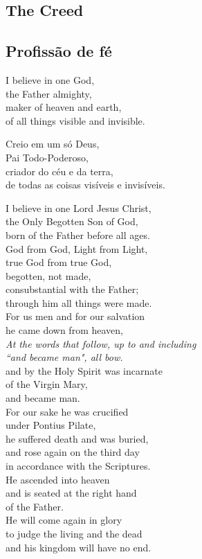 \documentclass[10pt,a5]{article}
\newcommand \subsect[2] {\subsection*{#1} \switchcolumn \subsection*{#2} \switchcolumn*}
\begin{document}
\begin{paracol}{2}

 \subsect{The Creed}{Profiss\~ao de f\'e}
I believe in one God,\\
the Father almighty,\\
maker of heaven and earth,\\
of all things visible and invisible.\\

\switchcolumn

Creio em um só Deus,\\
Pai Todo-Poderoso,\\
criador do céu e da terra,  \\
de todas as coisas visíveis e invisíveis.  \\

\switchcolumn

I believe in one Lord Jesus Christ,\\
the Only Begotten Son of God,\\
born of the Father before all ages.\\
God from God, Light from Light,\\
true God from true God,\\
begotten, not made,\\
consubstantial with the Father;\\
through him all things were made.\\
For us men and for our salvation\\
he came down from heaven,\\
{\color{red}\hspace*{4em}\small\textit{ At the words that follow, up to and including}}\\
{\color{red}\hspace*{6em}\small\textit{``and became man", all bow.}}\\
and by the Holy Spirit was incarnate\\
of the Virgin Mary,\\
and became man.\\
For our sake he was crucified\\
under Pontius Pilate,\\
he suffered death and was buried,\\
and rose again on the third day\\
in accordance with the Scriptures.\\
He ascended into heaven\\
and is seated at the right hand\\
of the Father.\\
He will come again in glory\\
to judge the living and the dead\\
and his kingdom will have no end.\\


\end{paracol}
\end{document}
